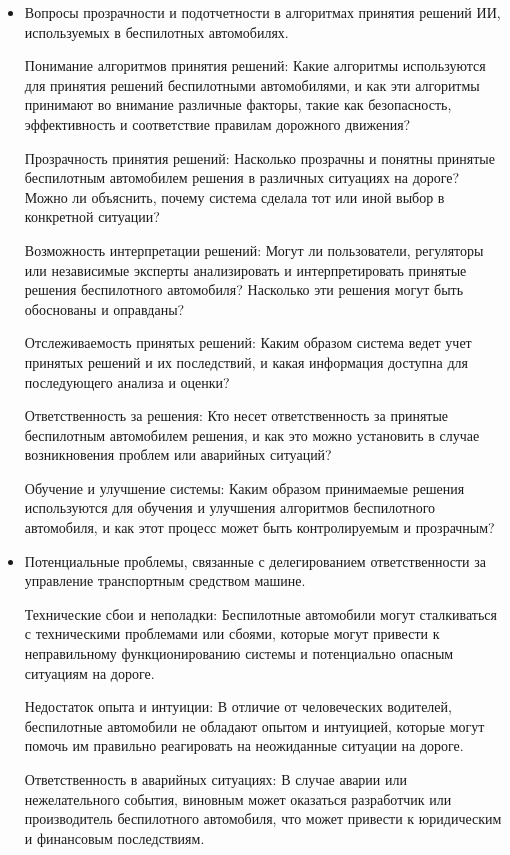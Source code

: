 \documentclass{article}
\begin{document}
\begin{itemize}
\begin{itemize}
        \item Вопросы прозрачности и подотчетности в алгоритмах принятия решений ИИ, используемых в беспилотных автомобилях.

        Понимание алгоритмов принятия решений: Какие алгоритмы используются для принятия решений беспилотными автомобилями, и как эти алгоритмы принимают во внимание различные факторы, такие как безопасность, эффективность и соответствие правилам дорожного движения?

        Прозрачность принятия решений: Насколько прозрачны и понятны принятые беспилотным автомобилем решения в различных ситуациях на дороге? Можно ли объяснить, почему система сделала тот или иной выбор в конкретной ситуации?

        Возможность интерпретации решений: Могут ли пользователи, регуляторы или независимые эксперты анализировать и интерпретировать принятые решения беспилотного автомобиля? Насколько эти решения могут быть обоснованы и оправданы?

        Отслеживаемость принятых решений: Каким образом система ведет учет принятых решений и их последствий, и какая информация доступна для последующего анализа и оценки?

        Ответственность за решения: Кто несет ответственность за принятые беспилотным автомобилем решения, и как это можно установить в случае возникновения проблем или аварийных ситуаций?

        Обучение и улучшение системы: Каким образом принимаемые решения используются для обучения и улучшения алгоритмов беспилотного автомобиля, и как этот процесс может быть контролируемым и прозрачным?
        
        \item Потенциальные проблемы, связанные с делегированием ответственности за управление транспортным средством машине.

        Технические сбои и неполадки: Беспилотные автомобили могут сталкиваться с техническими проблемами или сбоями, которые могут привести к неправильному функционированию системы и потенциально опасным ситуациям на дороге.

        Недостаток опыта и интуиции: В отличие от человеческих водителей, беспилотные автомобили не обладают опытом и интуицией, которые могут помочь им правильно реагировать на неожиданные ситуации на дороге.

        Ответственность в аварийных ситуациях: В случае аварии или нежелательного события, виновным может оказаться разработчик или производитель беспилотного автомобиля, что может привести к юридическим и финансовым последствиям.


\end{itemize}
\end{itemize}
\end{document}
